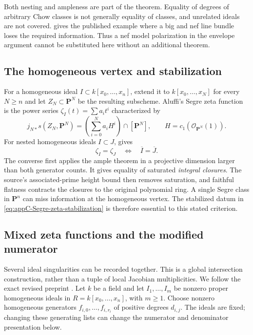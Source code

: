 Both nesting and ampleness are part of the theorem. Equality of
degrees of arbitrary Chow classes is not generally equality of
classes, and unrelated ideals are not covered.
 gives the published example
where a big and nef line bundle loses the required information.
Thus a nef model polarization in the envelope argument cannot
be substituted here without an additional theorem.

\subsection{The homogeneous vertex and stabilization}
\label{sec:appC-Segre-zeta}

For a homogeneous ideal $I\subset k[x_0,\ldots,x_n]$, extend it
to $k[x_0,\ldots,x_N]$ for every $N\geq n$ and let
$Z_N\subset\mathbf P^N$ be the resulting subscheme. Aluffi's
Segre zeta function is the power series $\zeta_I(t)=\sum a_i t^i$
characterized by
\[
 j_{N*}s(Z_N,\mathbf P^N)
 =\left(\sum_{i=0}^N a_iH^i\right)\cap[\mathbf P^N],
 \qquad H=c_1(\mathcal O_{\mathbf P^N}(1)).
\tag{C.33}\label{eq:appC-Segre-zeta-stabilization}
\]
For nested homogeneous ideals $I\subset J$,
\cite[Corollary~5.2]{CidRuiz26SegrePublished} gives
\[
 \zeta_I=\zeta_J
 \quad\Longleftrightarrow\quad
 \overline I=\overline J.
\tag{C.34}\label{eq:appC-Segre-zeta-dependence}
\]
The converse first applies the ample theorem in a projective
dimension larger than both generator counts. It gives equality
of saturated \emph{integral closures}. The source's associated-prime
height bound then removes saturation, and faithful flatness
contracts the closures to the original polynomial ring.
A single Segre class in $\mathbf P^n$ can miss information at
the homogeneous vertex. The stabilized datum in
\eqref{eq:appC-Segre-zeta-stabilization} is therefore essential
to this stated criterion.

\subsection{Mixed zeta functions and the modified numerator}
\label{sec:appC-mixed-Segre-zeta}

Several ideal singularities can be recorded together. This is a
global intersection construction, rather than a tuple of local
Jacobian multiplicities. We follow the exact revised preprint
\cite{CidRuiz26MixedSegreV2}. Let $k$ be a field and let
$I_1,\ldots,I_m$ be nonzero proper homogeneous ideals in
$R=k[x_0,\ldots,x_n]$, with $m\geq1$. Choose nonzero homogeneous
generators $f_{i,0},\ldots,f_{i,r_i}$ of positive degrees $d_{i,j}$.
The ideals are fixed; changing these generating lists can change
the numerator and denominator presentation below.

